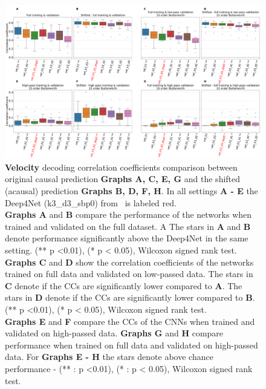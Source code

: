\begin{figure}[!htpb]
\centering
   \includegraphics[width=1\linewidth]{img/ch4/original_vs_shifted_vel_performance_comparison}
   \caption[Velocity: non-shifted vs. shifted setting performances]{\textbf{Velocity} decoding correlation coefficients comparison between original causal prediction \textbf{Graphs A, C, E, G} and the shifted (acausal) prediction \textbf{Graphs B, D, F, H}. In all settings \textbf{
   A - E} the Deep4Net (k3\_d3\_sbp0) from~\cite{Hammer-2021} is labeled red.\\ \textbf{Graphs A} and \textbf{B} compare the performance of the networks when trained and validated on the full dataset. A The stars in \textbf{A} and \textbf{B} denote performance significantly above the Deep4Net in the same setting. (** p <0.01), (* p < 0.05), Wilcoxon signed rank test.
   \\\textbf{Graphs C} and \textbf{D} show the correlation coefficients of the networks trained on full data and validated on low-passed data. 
   The stars in \textbf{C} denote if the CCs are significantly lower compared to \textbf{A}. The stars in \textbf{D} denote if the CCs are significantly lower compared to \textbf{B}. (** p <0.01), (* p < 0.05), Wilcoxon signed rank test.
   \\\textbf{Graphs E} and \textbf{F} compare the CCs of the CNNs when trained and validated on high-passed data. \textbf{Graphs G} and \textbf{H} compare performance when trained on full data and validated on high-passed data. For \textbf{Graphs E - H} the stars denote above chance performance - (** : p <0.01), (* : p < 0.05), Wilcoxon signed rank test.}
   \label{fig:shifted-performance-vel}

\end{figure}

